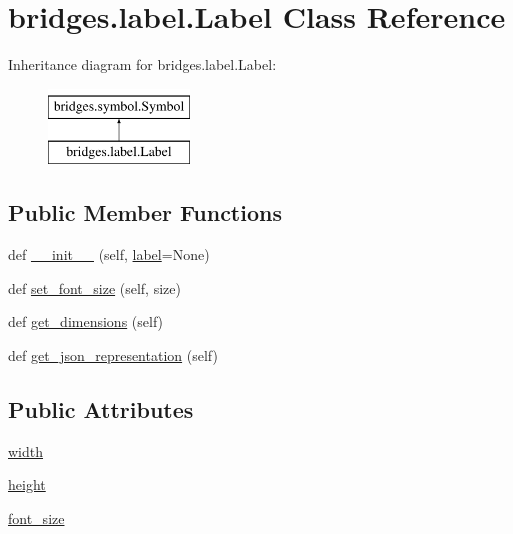 \hypertarget{classbridges_1_1label_1_1_label}{}\section{bridges.\+label.\+Label Class Reference}
\label{classbridges_1_1label_1_1_label}
Inheritance diagram for bridges.\+label.\+Label\+:\begin{figure}[H]
\begin{center}
\leavevmode
\includegraphics[height=2.000000cm]{classbridges_1_1label_1_1_label}
\end{center}
\end{figure}
\subsection*{Public Member Functions}
\begin{DoxyCompactItemize}
\item 
def \mbox{\hyperlink{classbridges_1_1label_1_1_label_a9a6a9ba4ccb2757f0577d741d730c95c}{\+\_\+\+\_\+init\+\_\+\+\_\+}} (self, \mbox{\hyperlink{classbridges_1_1symbol_1_1_symbol_a99c341040ad20f6059d10f065c3ddd44}{label}}=None)
\item 
def \mbox{\hyperlink{classbridges_1_1label_1_1_label_a165c6458a93f75577bb590a2789cabf0}{set\+\_\+font\+\_\+size}} (self, size)
\item 
def \mbox{\hyperlink{classbridges_1_1label_1_1_label_a627bc596c7e3db837e3b1575282e1b98}{get\+\_\+dimensions}} (self)
\item 
def \mbox{\hyperlink{classbridges_1_1label_1_1_label_a5075b73938ca71eed43af12f26a71842}{get\+\_\+json\+\_\+representation}} (self)
\end{DoxyCompactItemize}
\subsection*{Public Attributes}
\begin{DoxyCompactItemize}
\item 
\mbox{\hyperlink{classbridges_1_1label_1_1_label_a8cbf497432889744a3690eb75ebf8ded}{width}}
\item 
\mbox{\hyperlink{classbridges_1_1label_1_1_label_a2bf622aa77b4ad7d6918db99a8bfd4da}{height}}
\item 
\mbox{\hyperlink{classbridges_1_1label_1_1_label_ad6fb667d8c9bc2185303346e041db9a5}{font\+\_\+size}}
\end{DoxyCompactItemize}

